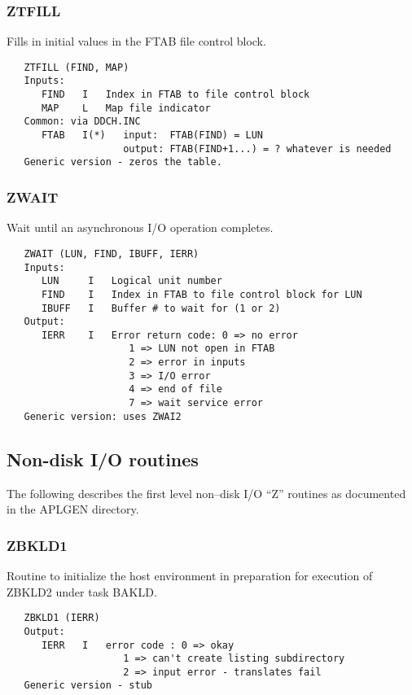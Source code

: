 \subsubsection{ZTFILL}
Fills in initial values in the FTAB file control block.
\begin{verbatim}
   ZTFILL (FIND, MAP)
   Inputs:
      FIND   I   Index in FTAB to file control block
      MAP    L   Map file indicator
   Common: via DDCH.INC
      FTAB   I(*)   input:  FTAB(FIND) = LUN
                    output: FTAB(FIND+1...) = ? whatever is needed
   Generic version - zeros the table.
\end{verbatim}

\subsubsection{ZWAIT}
Wait until an asynchronous I/O operation completes.
\begin{verbatim}
   ZWAIT (LUN, FIND, IBUFF, IERR)
   Inputs:
      LUN     I   Logical unit number
      FIND    I   Index in FTAB to file control block for LUN
      IBUFF   I   Buffer # to wait for (1 or 2)
   Output:
      IERR    I   Error return code: 0 => no error
                     1 => LUN not open in FTAB
                     2 => error in inputs
                     3 => I/O error
                     4 => end of file
                     7 => wait service error
   Generic version: uses ZWAI2
\end{verbatim}

\subsection{Non-disk I/O routines }

   The following describes the first level non--disk I/O ``Z'' routines as
documented in the APLGEN directory.

\subsubsection{ZBKLD1}
Routine to initialize the host environment in preparation for
execution of ZBKLD2 under task BAKLD.
\begin{verbatim}
   ZBKLD1 (IERR)
   Output:
      IERR   I   error code : 0 => okay
                    1 => can't create listing subdirectory
                    2 => input error - translates fail
   Generic version - stub
\end{verbatim}

